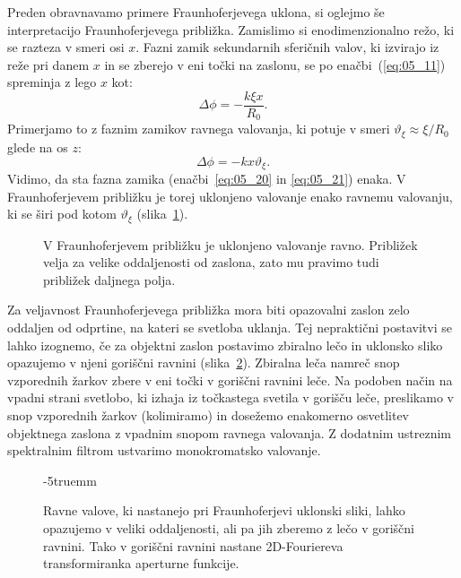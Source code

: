 Preden obravnavamo primere Fraunhoferjevega uklona, si oglejmo še interpretacijo 
Fraunhoferjevega približka. Zamislimo si enodimenzionalno režo, ki se razteza v smeri 
osi $x$. Fazni zamik sekundarnih sferičnih valov, ki izvirajo iz reže pri danem $x$ 
in se zberejo v eni točki na zaslonu, se po enačbi~(\ref{eq:05_11}) spreminja z lego $x$ kot:
\begin{equation}
\Delta \phi = -\frac{k \xi x}{R_0}.
\label{eq:05_20}
\end{equation}
Primerjamo to z faznim zamikov ravnega valovanja, ki potuje v smeri $\vartheta_\xi \approx
\xi/R_0$ glede na os $z$:
\begin{equation}
\Delta \phi = - k x \vartheta_\xi.
\label{eq:05_21}
\end{equation}
Vidimo, da sta fazna zamika (enačbi~\ref{eq:05_20} in \ref{eq:05_21}) enaka. 
V Fraunhoferjevem približku je torej uklonjeno valovanje
enako ravnemu valovanju, ki se širi pod kotom $\vartheta_\xi$ 
(slika~\ref{fig:05_ravnivalovi}).
\begin{figure}[h]
\centering
\def\svgwidth{75truemm} 

\caption{V Fraunhoferjevem približku je uklonjeno valovanje ravno. Približek
velja za velike oddaljenosti od zaslona, zato mu pravimo tudi približek
daljnega polja.}
\label{fig:05_ravnivalovi}
\end{figure}

Za veljavnost Fraunhoferjevega približka mora biti opazovalni zaslon zelo
oddaljen od odprtine, na kateri se svetloba uklanja. Tej nepraktični 
postavitvi se lahko izognemo, če za objektni zaslon postavimo zbiralno 
lečo in uklonsko sliko opazujemo v njeni goriščni ravnini (slika~\ref{fig:05_2DFourier}). 
Zbiralna leča namreč snop vzporednih žarkov zbere v eni 
točki v goriščni ravnini leče. Na podoben način na vpadni strani svetlobo, ki 
izhaja iz točkastega svetila v gorišču leče, preslikamo v snop vzporednih žarkov (kolimiramo)
in dosežemo enakomerno osvetlitev
objektnega zaslona z vpadnim snopom ravnega valovanja.
Z dodatnim ustreznim spektralnim filtrom ustvarimo 
monokromatsko valovanje.
\begin{figure}[ht]
\centering
\def\svgwidth{80truemm} 

\caption{Ravne valove, ki nastanejo pri Fraunhoferjevi uklonski sliki, lahko opazujemo v
veliki oddaljenosti, ali pa jih zberemo z lečo v goriščni ravnini. Tako v goriščni
ravnini nastane 2D-Fouriereva transformiranka aperturne funkcije.}
\label{fig:05_2DFourier}
\vglue-5truemm
\end{figure}

